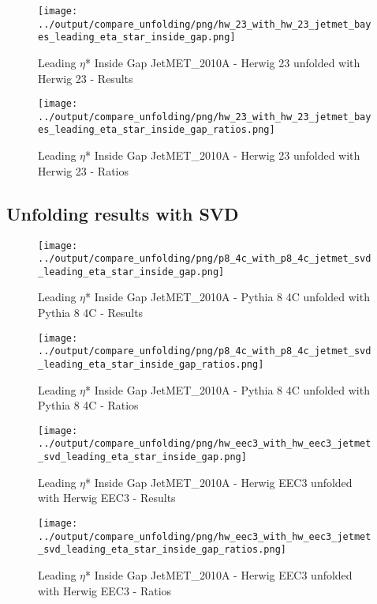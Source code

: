 \documentclass[11pt]{book}
\begin{document}
\begin{figure}[ht]
\centering
\texttt{[image: ../output/compare\_unfolding/png/hw\_23\_with\_hw\_23\_jetmet\_bayes\_leading\_eta\_star\_inside\_gap.png]}
\caption{Leading $\eta$* Inside Gap JetMET\_2010A - Herwig 23 unfolded with Herwig 23 - Results}
\label{hw_23_hw_23_jetmet_bayes_leading_eta_star_inside_gap_a}
\end{figure}

\begin{figure}[ht]
\centering
\texttt{[image: ../output/compare\_unfolding/png/hw\_23\_with\_hw\_23\_jetmet\_bayes\_leading\_eta\_star\_inside\_gap\_ratios.png]}
\caption{Leading $\eta$* Inside Gap JetMET\_2010A - Herwig 23 unfolded with Herwig 23 - Ratios}
\label{hw_23_hw_23_jetmet_bayes_leading_eta_star_inside_gap_b}
\end{figure}


\clearpage
\subsection{Unfolding results with SVD}

\begin{figure}[ht]
\centering
\texttt{[image: ../output/compare\_unfolding/png/p8\_4c\_with\_p8\_4c\_jetmet\_svd\_leading\_eta\_star\_inside\_gap.png]}
\caption{Leading $\eta$* Inside Gap JetMET\_2010A - Pythia 8 4C unfolded with Pythia 8 4C - Results}
\label{p8_p8_jetmet_svd_leading_eta_star_inside_gap_a}
\end{figure}

\begin{figure}[ht]
\centering
\texttt{[image: ../output/compare\_unfolding/png/p8\_4c\_with\_p8\_4c\_jetmet\_svd\_leading\_eta\_star\_inside\_gap\_ratios.png]}
\caption{Leading $\eta$* Inside Gap JetMET\_2010A - Pythia 8 4C unfolded with Pythia 8 4C - Ratios}
\label{p8_p8_jetmet_svd_leading_eta_star_inside_gap_b}
\end{figure}

\begin{figure}[ht]
\centering
\texttt{[image: ../output/compare\_unfolding/png/hw\_eec3\_with\_hw\_eec3\_jetmet\_svd\_leading\_eta\_star\_inside\_gap.png]}
\caption{Leading $\eta$* Inside Gap JetMET\_2010A - Herwig EEC3 unfolded with Herwig EEC3 - Results}
\label{hw_eec3_hw_eec3_jetmet_svd_leading_eta_star_inside_gap_a}
\end{figure}

\begin{figure}[ht]
\centering
\texttt{[image: ../output/compare\_unfolding/png/hw\_eec3\_with\_hw\_eec3\_jetmet\_svd\_leading\_eta\_star\_inside\_gap\_ratios.png]}
\caption{Leading $\eta$* Inside Gap JetMET\_2010A - Herwig EEC3 unfolded with Herwig EEC3 - Ratios}
\label{hw_eec3_hw_eec3_jetmet_svd_leading_eta_star_inside_gap_b}
\end{figure}
\end{document}
